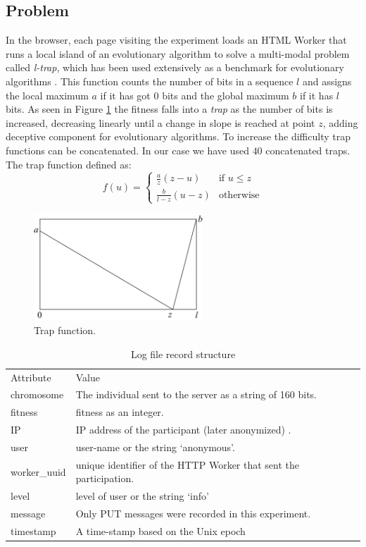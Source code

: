\documentclass{llncs}
\begin{document}
\subsection{Problem}
In the browser, each page visiting the experiment loads an HTML Worker
that runs a local island of an evolutionary algorithm to solve a
multi-modal problem called {\em l-trap}, which has been used extensively 
as a benchmark for evolutionary algorithms \cite{fernandes2009using,nijssen2003analysis}. 
This function counts the number of bits in a sequence $l$ and assigns
the local maximum $a$ if it has got 0 bits and the global maximum $b$ if it has $l$
bits. As seen in Figure \ref{fig:trap} the fitness falls into a {\em trap} 
as the number of bits is increased, decreasing linearly until a change in slope 
is reached at point $z$, adding deceptive component for evolutionary algorithms. 
To increase the difficulty trap functions can be concatenated. 
In our case we have used $40$ concatenated traps. The trap function  defined as:   
\[ f(u)= 
    \begin{cases} 
      \frac{a}{z}(z-u) & \text{if } u\leq z\\
      \frac{b}{l-z} (u-z)& \text{otherwise} 
   \end{cases}
\]
\begin{figure}[t]
    \centering
        \includegraphics[width=2.5in]{img/trap.png}
    \caption{Trap function.
    }
    \label{fig:trap}
\end{figure}
\begin{table}
  \small
  \caption{ Log file record structure}
  \label{tab:record} 
  \centering
  \small
  \begin{tabular}{l  l}
    \hline\noalign{\smallskip}
    Attribute & Value \\
    \noalign{\smallskip}\hline\noalign{\smallskip}
    chromosome   & The individual sent to the server as a string of 160 bits.  \\ \hline
    fitness & fitness as an integer.  \\ \hline
    IP & IP address of the participant (later anonymized) .\\ \hline
    user & user-name or the string `anonymous'.  \\ \hline
    worker\_uuid & unique identifier of the HTTP Worker that sent the participation.   \\ \hline
    level &  level of user or the string `info' \\ \hline
    message & Only PUT messages were recorded in this experiment. \\ \hline
    timestamp & A time-stamp based on the Unix epoch\\ \hline
  \end{tabular}
\end{table}
\end{document}
